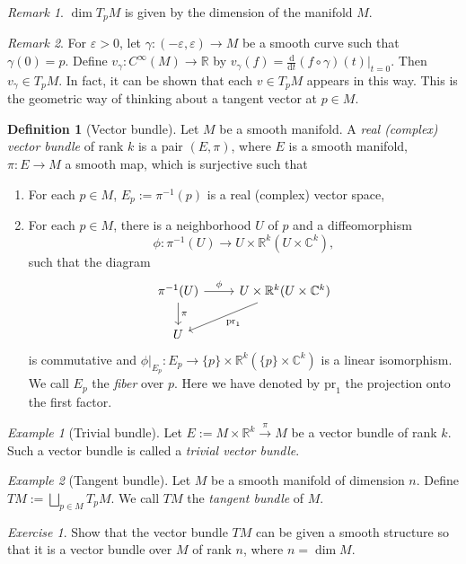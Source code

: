 \documentclass[12pt]{amsart}
\numberwithin{equation}{section}
\theoremstyle{plain}
\theoremstyle{definition}
\newtheorem{defn}{Definition}[subsection]
\theoremstyle{remark}
\newtheorem{rem}{Remark}[subsection]
\newtheorem{exe}{Exercise}[subsection]
\newtheorem{ex}{Example}[subsection]
\newcommand{\R}{\mathbb{R}}
\newcommand{\dd}{{\mathrm{d}}}
\begin{document}
\begin{rem}
$\dim T_pM$ is given by the dimension of the manifold $M$.
\end{rem}

\begin{rem}
For $\varepsilon>0$, let $\gamma\colon(-\varepsilon,\varepsilon)\to M$ be a smooth curve such that $\gamma(0)=p$. Define $v_\gamma\colon C^\infty(M)\to \R$ by $v_\gamma(f)=\frac{\dd}{\dd t}(f\circ \gamma)(t)\big|_{t=0}$. Then $v_\gamma\in T_pM$. In fact, it can be shown that each $v\in T_pM$ appears in this way. This is the geometric way of thinking about a tangent vector at $p\in M$.
\end{rem}

\begin{defn}[Vector bundle]
Let $M$ be a smooth manifold. A \emph{real (complex) vector bundle} of rank $k$ is a pair $(E,\pi)$, where $E$ is a smooth manifold, $\pi\colon E\to M$ a smooth map, which is surjective such that
\begin{enumerate}
\item{For each $p\in M$, $E_p:=\pi^{-1}(p)$ is a real (complex) vector space,}
\item{For each $p\in M$, there is a neighborhood $U$ of $p$ and a diffeomorphism
$$\phi\colon \pi^{-1}(U)\to U\times \R^k (U\times \mathbb{C}^k),$$
such that the diagram
\[
\begin{tikzcd}
\pi^{-1}(U)\arrow[d,"\pi"]\arrow[r,"\phi"]&U\times \R^k (U\times \mathbb{C}^k)\arrow[dl,"\mathrm{pr}_1"]\\
U&
\end{tikzcd}
\]
is commutative and $\phi\big|_{E_p}\colon E_p\to \{p\}\times\R^k (\{p\}\times\mathbb{C}^k)$ is a linear isomorphism. We call $E_p$ the \emph{fiber} over $p$. Here we have denoted by $\mathrm{pr}_1$ the projection onto the first factor.
}
\end{enumerate}
\end{defn}

\begin{ex}[Trivial bundle]
Let $E:=M\times \R^k\xrightarrow{\pi}M$ be a vector bundle of rank $k$. Such a vector bundle is called a \emph{trivial vector bundle}.
\end{ex}
\begin{ex}[Tangent bundle]
Let $M$ be a smooth manifold of dimension $n$. Define $TM:=\bigsqcup_{p\in M}T_pM$. We call $TM$ the \emph{tangent bundle} of $M$.
\end{ex}

\begin{exe}
Show that the vector bundle $TM$ can be given a smooth structure so that it is a vector bundle over $M$ of rank $n$, where $n=\dim M$. 
\end{exe}
\end{document}
